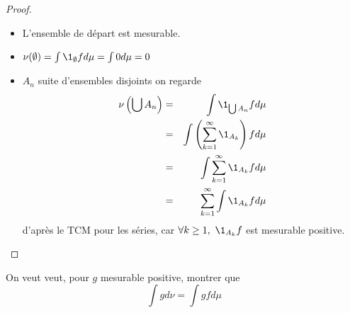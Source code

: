 \begin{proof}
	\begin{itemize}
		\item L'ensemble de départ est mesurable.
		\item $\nu(\emptyset) = \int \1_{\emptyset} f d\mu = \int 0 d \mu = 0$
		\item $A_n$ suite d'ensembles disjoints on regarde
		      \begin{eqnarray*}
			      \nu\left(\bigcup A_n\right) &=& \int \1_{\bigcup A_n} f d\mu \\
			      &=& \int \left( \sum_{k=1}^{\infty} \1_{A_k} \right) f d\mu \\
			      &=& \int \sum_{k=1}^{\infty} \1_{A_k} f d\mu \\
			      &=& \sum_{k=1}^{\infty} \int \1_{A_k} f d\mu
		      \end{eqnarray*}
		      d'après le TCM pour les séries, car $\forall k \geq 1, \ \1_{A_k}f$ est mesurable positive.
	\end{itemize}
\end{proof}

\begin{remarque} \label{rem:transfert}
	On veut veut, pour $g$ mesurable positive, montrer que
	$$ \int g d\nu = \int g f d\mu $$
\end{remarque}

